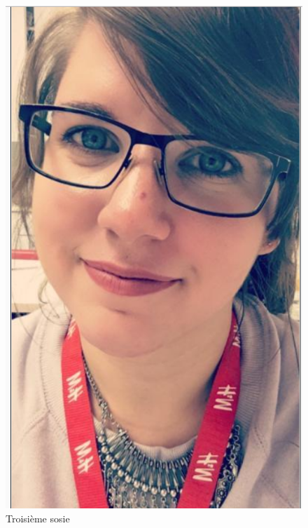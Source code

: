 \documentclass[a4paper,12pt]{article}
\begin{document}
\begin{figure}[!h]
    \centering
        \includegraphics[scale=0.3]{images/ResS13.PNG}
        \caption{Troisième sosie}
    \end{figure}
    
\end{document}
